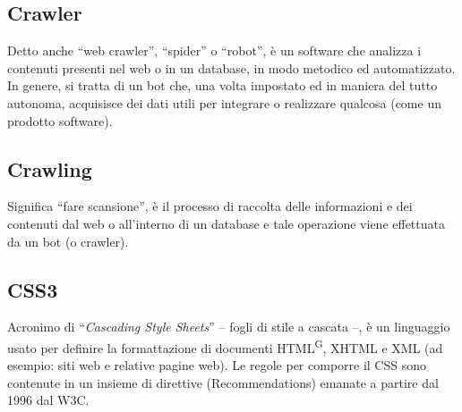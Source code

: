 \subsection{Crawler} Detto anche “web crawler”, “spider” o “robot”, è un software che analizza i contenuti presenti nel web o in un database, in modo metodico ed automatizzato. In genere, si tratta di un bot che, una volta impostato ed in maniera del tutto autonoma, acquisisce dei dati utili per integrare o realizzare qualcosa (come un prodotto software). 

\subsection{Crawling} Significa “fare scansione”, è il processo di raccolta delle informazioni e dei contenuti dal web o all’interno di un database e tale operazione viene effettuata da un bot (o crawler). 

\subsection{CSS3} 
Acronimo di “\textit{Cascading Style Sheets}” – fogli di stile a cascata –, è un linguaggio usato per definire la formattazione di documenti HTML\textsuperscript{G}, XHTML e XML (ad esempio: siti web e relative pagine web). Le regole per comporre il CSS sono contenute in un insieme di direttive (Recommendations) emanate a partire dal 1996 dal W3C. 

\clearpage